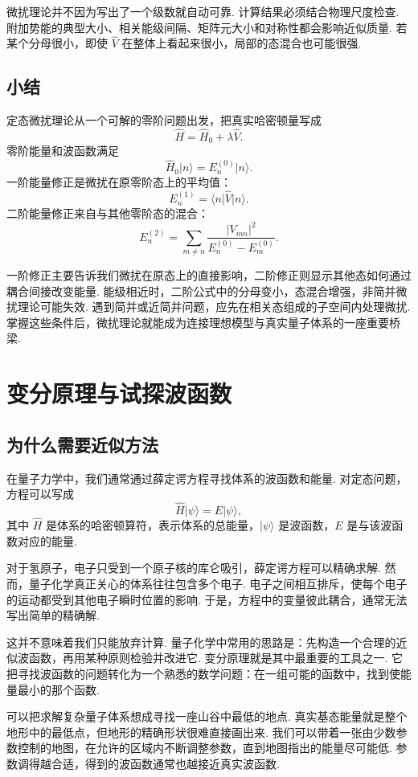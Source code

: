 \documentclass[UTF8,11pt,a4paper,openany]{ctexbook}
\newcommand{\ket}[1]{\lvert #1\rangle}\newcommand{\bra}[1]{\langle #1\rvert}
\begin{document}
\begin{limitbox}
微扰理论并不因为写出了一个级数就自动可靠. 计算结果必须结合物理尺度检查. 附加势能的典型大小、相关能级间隔、矩阵元大小和对称性都会影响近似质量. 若某个分母很小，即使 $\hat V$ 在整体上看起来很小，局部的态混合也可能很强. 
\end{limitbox}

\section{小结}

定态微扰理论从一个可解的零阶问题出发，把真实哈密顿量写成
\[
\hat H=\hat H_0+\lambda\hat V.
\]
零阶能量和波函数满足
\[
\hat H_0\ket n=E_n^{(0)}\ket n.
\]
一阶能量修正是微扰在原零阶态上的平均值：
\[
E_n^{(1)}=\bra n\hat V\ket n.
\]
二阶能量修正来自与其他零阶态的混合：
\[
E_n^{(2)}
=
\sum_{m\ne n}
\frac{|V_{mn}|^2}
{E_n^{(0)}-E_m^{(0)}}.
\]

一阶修正主要告诉我们微扰在原态上的直接影响，二阶修正则显示其他态如何通过耦合间接改变能量. 能级相近时，二阶公式中的分母变小，态混合增强，非简并微扰理论可能失效. 遇到简并或近简并问题，应先在相关态组成的子空间内处理微扰. 掌握这些条件后，微扰理论就能成为连接理想模型与真实量子体系的一座重要桥梁. 
\chapter{变分原理与试探波函数}

\section{为什么需要近似方法}

在量子力学中，我们通常通过薛定谔方程寻找体系的波函数和能量. 对定态问题，方程可以写成
\[
\hat H\ket{\psi}=E\ket{\psi},
\]
其中 $\hat H$ 是体系的哈密顿算符，表示体系的总能量，$\ket{\psi}$ 是波函数，$E$ 是与该波函数对应的能量. 

对于氢原子，电子只受到一个原子核的库仑吸引，薛定谔方程可以精确求解. 然而，量子化学真正关心的体系往往包含多个电子. 电子之间相互排斥，使每个电子的运动都受到其他电子瞬时位置的影响. 于是，方程中的变量彼此耦合，通常无法写出简单的精确解. 

这并不意味着我们只能放弃计算. 量子化学中常用的思路是：先构造一个合理的近似波函数，再用某种原则检验并改进它. 变分原理就是其中最重要的工具之一. 它把寻找波函数的问题转化为一个熟悉的数学问题：在一组可能的函数中，找到使能量最小的那个函数. 

\begin{analogybox}
可以把求解复杂量子体系想成寻找一座山谷中最低的地点. 真实基态能量就是整个地形中的最低点，但地形的精确形状很难直接画出来. 我们可以带着一张由少数参数控制的地图，在允许的区域内不断调整参数，直到地图指出的能量尽可能低. 参数调得越合适，得到的波函数通常也越接近真实波函数. 
\end{analogybox}
\end{document}
